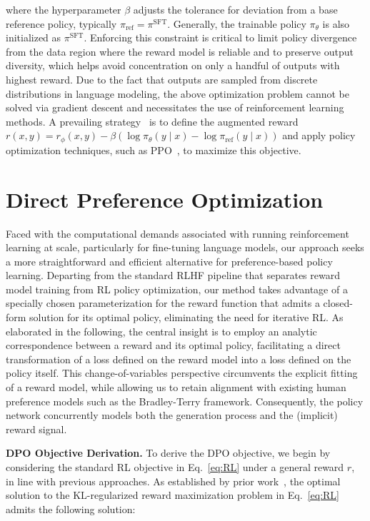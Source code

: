 where the hyperparameter $\beta$ adjusts the tolerance for deviation from a base reference policy, typically $\pi_\text{ref} = \pi^\text{SFT}$. Generally, the trainable policy $\pi_\theta$ is also initialized as $\pi^\text{SFT}$. Enforcing this constraint is critical to limit policy divergence from the data region where the reward model is reliable and to preserve output diversity, which helps avoid concentration on only a handful of outputs with highest reward. Due to the fact that outputs are sampled from discrete distributions in language modeling, the above optimization problem cannot be solved via gradient descent and necessitates the use of reinforcement learning methods. A prevailing strategy~\citep{ziegler2020finetuning, stiennon2022learning, bai2022training, ouyang2022training} is to define the augmented reward ${r(x, y) = r_{\phi}(x, y) -\beta (\log \pi_{\theta}(y\mid x) - \log \pi_\text{ref}(y\mid x))}$ and apply policy optimization techniques, such as PPO~\cite{schulman2017proximal}, to maximize this objective.

\section{Direct Preference Optimization}\label{sec:DPO}

Faced with the computational demands associated with running reinforcement learning at scale, particularly for fine-tuning language models, our approach seeks a more straightforward and efficient alternative for preference-based policy learning. Departing from the standard RLHF pipeline that separates reward model training from RL policy optimization, our method takes advantage of a specially chosen parameterization for the reward function that admits a closed-form solution for its optimal policy, eliminating the need for iterative RL. As elaborated in the following, the central insight is to employ an analytic correspondence between a reward and its optimal policy, facilitating a direct transformation of a loss defined on the reward model into a loss defined on the policy itself. This change-of-variables perspective circumvents the explicit fitting of a reward model, while allowing us to retain alignment with existing human preference models such as the Bradley-Terry framework. Consequently, the policy network concurrently models both the generation process and the (implicit) reward signal.

\textbf{DPO Objective Derivation.} To derive the DPO objective, we begin by considering the standard RL objective in Eq.~\ref{eq:RL} under a general reward $r$, in line with previous approaches. As established by prior work~\citep{peters2007reinforcement, peng2019advantage, korbak2022reinforcement, go2023aligning}, the optimal solution to the KL-regularized reward maximization problem in Eq.~\ref{eq:RL} admits the following solution:

